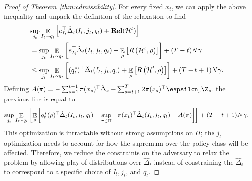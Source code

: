 \documentclass{article}
\newcommand{\exop}{\mathop{\ex}}
\newcommand{\rel}{\mathbf{Rel}}
\newcommand{\hist}{{\mathcal H}}
\begin{document}
\begin{proof}[Proof of Theorem~\ref{thm:admissibility}]
For every fixed $x_t$, we can apply the above inequality and unpack the definition of the relaxation to find
\begin{align*}
\lefteqn{  \sup_{j_t} \mathop{\ex}_{I_t\sim q_t}\left[e_{I_t}^\top\hat\Delta_t(I_t,j_t,q_t)
  +  \rel(\hist^t) \right]}&\\
  &=
    \sup_{j_t } \mathop{\ex}_{I_t\sim q_t}\left[e_{I_t}^\top\hat\Delta_t(I_t,j_t,q_t)
    +  \exop_\rho\left[R\left(\hist^{t},\rho\right)\right]\right]
    + (T-t)N\gamma\\
  &\leq
    \sup_{j_t}  \mathop{\ex}_{I_t\sim q_t}\left[(q_t^*)^\top \hat\Delta_t(I_t,j_t,q_t)
    +
  \exop_\rho\left[R\left(\hist^{t},\rho\right)\right]\right]
  +(T-t+1)N\gamma.
\end{align*}
Defining $A(\pi) = -\sum_{s=1}^{t-1} \pi(x_s)^\top \hat \Delta_s - \sum_{s=t+1}^T 2\pi(x_s)^\top  \eepsilon_{s} \Z_{s}$, the previous line is equal to
\begin{align*}
    \sup_{j_t} \mathop{\mathbb E}_{I_t\sim q_t}\left[\mathop{\mathbb E}_{\rho}\left[ q_t^*(\rho)^\top \hat \Delta_t (I_t,j_t,q_t)
    +
    \sup_{\pi\in\Pi} -\pi(x_t)^\top \hat\Delta_t(I_t,j_t,q_t) + A(\pi)\right]\right] + (T-t+1)N\gamma.
\end{align*}
This optimization is intractable without strong assumptions on $\Pi$; the $j_t$ optimization needs to account for how the supremum over the policy class will be affected. Therefore, we reduce the constraints on the adversary to relax the problem by allowing play of distributions over $\hat\Delta_t$ instead of constraining the $\hat\Delta_t$ to correspond to a specific choice of $I_t,j_t$, and $q_t$.


\end{proof}
\end{document}
